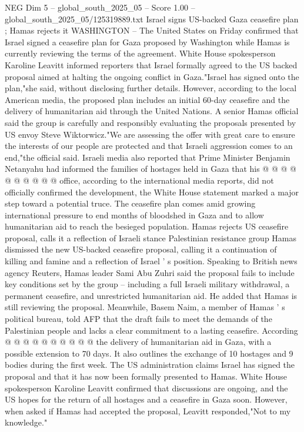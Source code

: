 \begin{textsample}{NEG Dim 5 – global\_south\_2025\_05 – Score 1.00 – global\_south\_2025\_05/125319889.txt}  \label{ex:f5_neg_337}
Israel signs US-backed Gaza ceasefire plan ; Hamas rejects it WASHINGTON -- The United States on Friday confirmed that Israel signed a ceasefire plan for Gaza proposed by Washington while Hamas is currently reviewing the terms of the agreement.
White House spokesperson Karoline Leavitt informed reporters that Israel formally agreed to the US backed proposal aimed at halting the ongoing conflict in Gaza."Israel has signed onto the plan,"she said, without disclosing further details.
However, according to the local American media, the proposed plan includes an initial 60-day ceasefire and the delivery of humanitarian aid through the United Nations.
A senior Hamas official said the group is carefully and responsibly evaluating the proposals presented by US envoy Steve Wiktorwicz."We are assessing the offer with great care to ensure the interests of our people are protected and that Israeli aggression comes to an end,"the official said.
Israeli media also reported that Prime Minister Benjamin Netanyahu had informed the families of hostages held in Gaza that his @ @ @ @ @ @ @ @ @ @ office, according to the international media reports, did not officially confirmed the development, the White House statement marked a major step toward a potential truce.
The ceasefire plan comes amid growing international pressure to end months of bloodshed in Gaza and to allow humanitarian aid to reach the besieged population.
Hamas rejects US ceasefire proposal, calls it a reflection of Israeli stance Palestinian resistance group Hamas dismissed the new US-backed ceasefire proposal, calling it a continuation of killing and famine and a reflection of Israel ' s position.
Speaking to British news agency Reuters, Hamas leader Sami Abu Zuhri said the proposal fails to include key conditions set by the group -- including a full Israeli military withdrawal, a permanent ceasefire, and unrestricted humanitarian aid.
He added that Hamas is still reviewing the proposal.
Meanwhile, Basem Naim, a member of Hamas ' s political bureau, told AFP that the draft fails to meet the demands of the Palestinian people and lacks a clear commitment to a lasting ceasefire.
According @ @ @ @ @ @ @ @ @ @ the delivery of humanitarian aid in Gaza, with a possible extension to 70 days.
It also outlines the exchange of 10 hostages and 9 bodies during the first week.
The US administration claims Israel has signed the proposal and that it has now been formally presented to Hamas.
White House spokesperson Karoline Leavitt confirmed that discussions are ongoing, and the US hopes for the return of all hostages and a ceasefire in Gaza soon.
However, when asked if Hamas had accepted the proposal, Leavitt responded,"Not to my knowledge."

\end{textsample}
